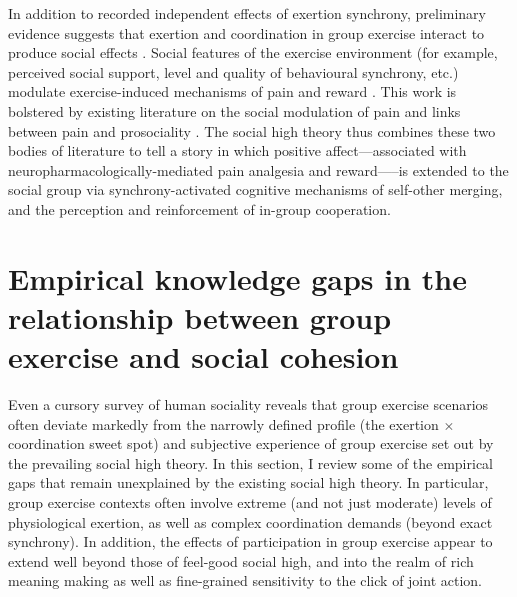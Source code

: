 \begin{CJK}{UTF8}{gbsn}
In addition to recorded independent effects of exertion synchrony,  preliminary evidence suggests that exertion and coordination in group exercise interact to produce social effects \citep{Jackson2018}.  Social features of the exercise environment (for example, perceived social support, level and quality of behavioural synchrony, etc.) modulate exercise-induced mechanisms of pain and reward \citep{Cohen2009,Sullivan2014,Tarr2015,Davis2015,Weinstein2016}. This work is bolstered by existing literature on the social modulation of pain \citep{Eisenberger2012a} and links between pain and prosociality \citep{Bastian2014a}.  The social high theory thus combines these two bodies of literature to tell a story in which positive affect---associated with neuropharmacologically-mediated pain analgesia and reward—--is extended to the social group via synchrony-activated cognitive mechanisms of self-other merging, and the perception and reinforcement of in-group cooperation.


\section{Empirical knowledge gaps in the relationship between group exercise and social cohesion\label{sect:empKnowGaps}}
Even a cursory survey of human sociality reveals that group exercise scenarios often deviate markedly from the narrowly defined profile (the exertion $\times$ coordination sweet spot) and subjective experience of group exercise set out by the prevailing social high theory.  In this section, I review some of the empirical gaps that remain unexplained by the existing social high theory.  In particular, group exercise contexts often involve extreme (and not just moderate) levels of physiological exertion, as well as complex coordination demands (beyond exact synchrony).  In addition, the effects of participation in group exercise appear to extend well beyond those of feel-good social high, and into the realm of rich meaning making as well as fine-grained sensitivity to the click of joint action.




\end{CJK}
